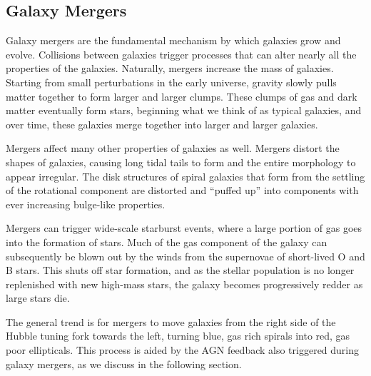 \subsection{Galaxy Mergers}

Galaxy mergers are the fundamental mechanism by which galaxies grow and evolve.  Collisions between galaxies trigger processes that can alter nearly all the properties of the galaxies.  Naturally, mergers increase the mass of galaxies.  Starting from small perturbations in the early universe, gravity slowly pulls matter together to form larger and larger clumps.  These clumps of gas and dark matter eventually form stars, beginning what we think of as typical galaxies, and over time, these galaxies merge together into larger and larger galaxies.

Mergers affect many other properties of galaxies as well.  Mergers distort the shapes of galaxies, causing long tidal tails to form and the entire morphology to appear irregular.  The disk structures of spiral galaxies that form from the settling of the rotational component are distorted and ``puffed up'' into components with ever increasing bulge-like properties.

Mergers can trigger wide-scale starburst events, where a large portion of gas goes into the formation of stars.  Much of the gas component of the galaxy can subsequently be blown out by the winds from the supernovae of short-lived O and B stars.  This shuts off star formation, and as the stellar population is no longer replenished with new high-mass stars, the galaxy becomes progressively redder as large stars die.

The general trend is for mergers to move galaxies from the right side of the Hubble tuning fork towards the left, turning blue, gas rich spirals into red, gas poor ellipticals.  This process is aided by the AGN feedback also triggered during galaxy mergers, as we discuss in the following section.







